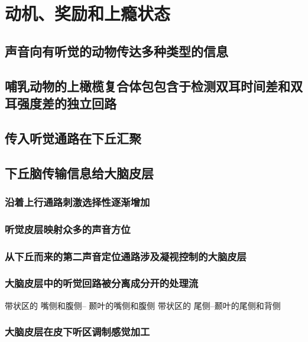 \chapter{动机、奖励和上瘾状态}

\section{声音向有听觉的动物传达多种类型的信息}

\section{哺乳动物的上橄榄复合体包包含于检测双耳时间差和双耳强度差的独立回路}

\section{传入听觉通路在下丘汇聚}


\section{下丘脑传输信息给大脑皮层}

\subsection{沿着上行通路刺激选择性逐渐增加}

\subsection{听觉皮层映射众多的声音方位}

\subsection{从下丘而来的第二声音定位通路涉及凝视控制的大脑皮层}


\subsection{大脑皮层中的听觉回路被分离成分开的处理流}
带状区的 嘴侧和腹侧-- 颞叶的嘴侧和腹侧
带状区的 尾侧--颞叶的尾侧和背侧

\subsection{大脑皮层在皮下听区调制感觉加工}


